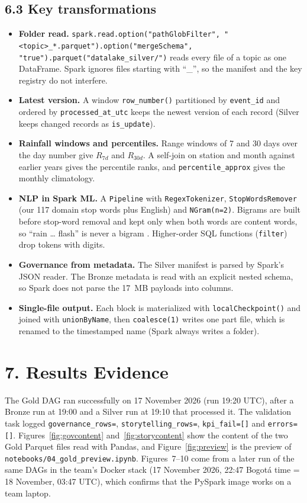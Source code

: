 \documentclass[stu, 12pt, letterpaper, donotrepeattitle, floatsintext, natbib]{apa7}
\begin{document}
\subsection{6.3 Key transformations}
\begin{itemize}
    \item \textbf{Folder read.} \texttt{spark.read.option("pathGlobFilter", "<topic>\_*.parquet").option("mergeSchema", "true").parquet("datalake\_silver/")} reads every file of a topic as one DataFrame. Spark ignores files starting with ``\_'', so the manifest and the key registry do not interfere.
    \item \textbf{Latest version.} A window \texttt{row\_number()} partitioned by \texttt{event\_id} and ordered by \texttt{processed\_at\_utc} keeps the newest version of each record (Silver keeps changed records as \texttt{is\_update}).
    \item \textbf{Rainfall windows and percentiles.} Range windows of 7 and 30 days over the day number give $R_{7d}$ and $R_{30d}$. A self-join on station and month against earlier years gives the percentile ranks, and \texttt{percentile\_approx} gives the monthly climatology.
    \item \textbf{NLP in Spark ML.} A \texttt{Pipeline} with \texttt{RegexTokenizer}, \texttt{StopWordsRemover} (our 117 domain stop words plus English) and \texttt{NGram(n=2)}. Bigrams are built before stop-word removal and kept only when both words are content words, so ``rain \ldots{} flash'' is never a bigram \citep{manning2008}. Higher-order SQL functions (\texttt{filter}) drop tokens with digits.
    \item \textbf{Governance from metadata.} The Silver manifest is parsed by Spark's JSON reader. The Bronze metadata is read with an explicit nested schema, so Spark does not parse the 17~MB payloads into columns.
    \item \textbf{Single-file output.} Each block is materialized with \texttt{localCheckpoint()} and joined with \texttt{unionByName}, then \texttt{coalesce(1)} writes one part file, which is renamed to the timestamped name (Spark always writes a folder).
\end{itemize}

\section{\large 7. Results Evidence}
The Gold DAG ran successfully on 17 November 2026 (run 19:20 UTC), after a Bronze run at 19:00 and a Silver run at 19:10 that processed it. The validation task logged \texttt{governance\_rows=\GovRows}, \texttt{storytelling\_rows=\StoryRows}, \texttt{kpi\_fail=[]} and \texttt{errors=[]}. Figures~\ref{fig:govcontent} and~\ref{fig:storycontent} show the content of the two Gold Parquet files read with Pandas, and Figure~\ref{fig:preview} is the preview of \texttt{notebooks/04\_gold\_preview.ipynb}. Figures~7--10 come from a later run of the same DAGs in the team's Docker stack (17 November 2026, 22:47 Bogotá time = 18 November, 03:47 UTC), which confirms that the PySpark image works on a team laptop.
\end{document}

